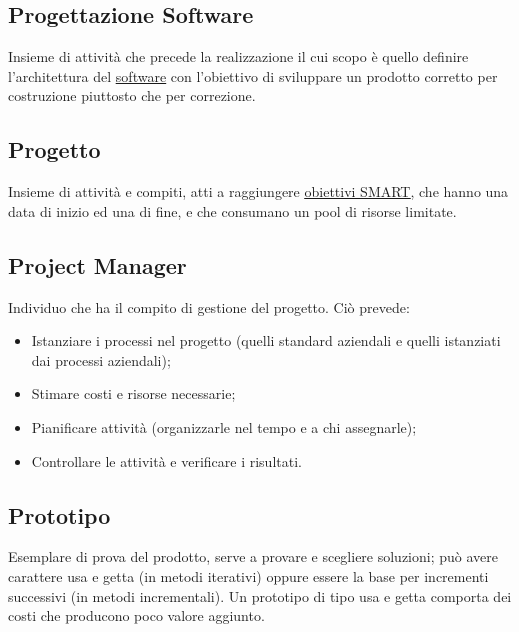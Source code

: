 	\subsection{Progettazione Software}
	\label{sec:progettazionesoftware}
	Insieme di attività che precede la realizzazione il cui scopo è quello definire l'architettura del \underline{\hyperref[sec:prodottosoftware]{software}} con l'obiettivo di sviluppare un prodotto corretto per costruzione piuttosto che per correzione.
	
	\subsection{Progetto}
	\label{sec:progetto}
	Insieme di attività e compiti, atti a raggiungere \underline{\hyperref[sec:smart]{obiettivi SMART}}, che hanno una data di inizio ed una di fine, e che consumano un pool di risorse limitate.	
	
	\subsection{Project Manager}
	\label{sec:projectmanager}
	Individuo che ha il compito di gestione del progetto. Ciò prevede:
	\begin{itemize}  
	\item Istanziare i processi nel progetto (quelli standard aziendali e quelli istanziati dai processi aziendali);
	\item Stimare costi e risorse necessarie;
	\item Pianificare attività (organizzarle nel tempo e a chi assegnarle);
	\item Controllare le attività e verificare i risultati.
	\end{itemize}	
		
	\subsection{Prototipo}
	\label{sec:prototipo}
	Esemplare di prova del prodotto, serve a provare e scegliere soluzioni; può avere carattere usa e getta (in metodi iterativi) oppure essere la base per incrementi successivi (in metodi incrementali).
	Un prototipo di tipo usa e getta comporta dei costi che producono poco valore aggiunto.\newpage	

